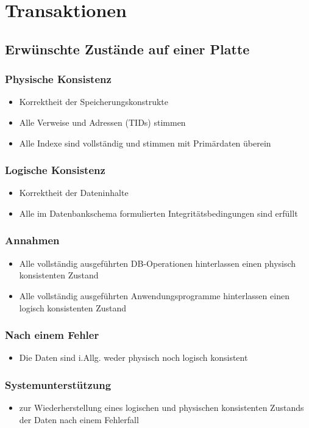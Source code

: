 \section{Transaktionen}
\subsection{Erwünschte Zustände auf einer Platte}
\subsubsection{Physische Konsistenz}
\begin{itemize}
	\item Korrektheit der Speicherungskonstrukte
	\item Alle Verweise und Adressen (TIDs) stimmen
	\item Alle Indexe sind vollständig und stimmen mit Primärdaten überein
\end{itemize}
\subsubsection{Logische Konsistenz}
\begin{itemize}
	\item Korrektheit der Dateninhalte
	\item Alle im Datenbankschema formulierten Integritätsbedingungen sind erfüllt
\end{itemize}
\subsubsection{Annahmen}
\begin{itemize}
	\item Alle vollständig ausgeführten DB-Operationen hinterlassen einen physisch konsistenten Zustand
	\item Alle vollständig ausgeführten Anwendungsprogramme hinterlassen einen logisch konsistenten Zustand 
\end{itemize}
\subsubsection{Nach einem Fehler}
\begin{itemize}
	\item Die Daten sind i.Allg. weder physisch noch logisch konsistent 
\end{itemize}
\subsubsection{Systemunterstützung}
\begin{itemize}
	\item zur Wiederherstellung eines logischen und physischen konsistenten Zustands der Daten nach einem Fehlerfall
\end{itemize}
